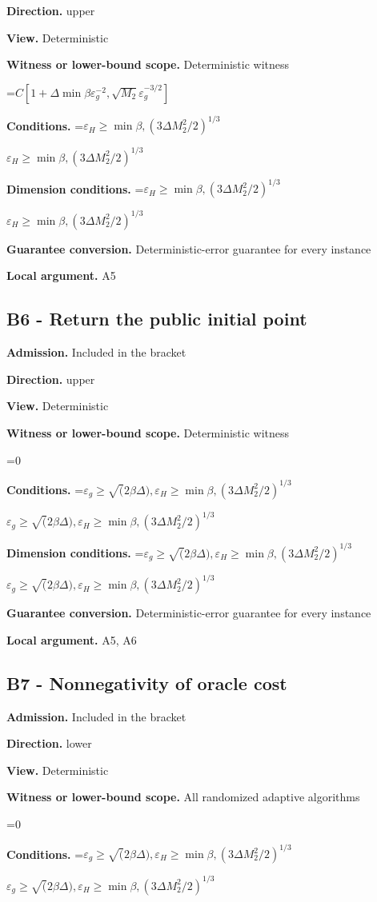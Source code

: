 \documentclass[10pt,a4paper]{article}
\newcommand{\AtlasMath}[1]{\par\begingroup\centering\setbox0=\hbox{$\displaystyle #1$}\ifdim\wd0>1.4\linewidth\typeout{ATLAS WIDE FORMULA: \the\wd0}\fi\ifdim\wd0>\linewidth\resizebox{\linewidth}{!}{\box0}\else\box0\fi\par\endgroup}
\newcommand{\AtlasInlineMath}[1]{\begingroup\setbox0=\hbox{$#1$}\ifdim\wd0>.4\linewidth\endgroup\AtlasMath{#1}\else\endgroup$#1$\fi}
\begin{document}
\textbf{Direction.} upper

\textbf{View.} Deterministic

\textbf{Witness or lower-bound scope.} Deterministic witness

\AtlasMath{C[1+\Delta \min{\beta\varepsilon_g^{-2},\sqrt{M_2}\varepsilon_g^{-3/2}}]}
\textbf{Conditions.} \AtlasInlineMath{\varepsilon_H\ge \min{\beta,(3\Delta M_2^2/2)^{1/3}}}

\textbf{Dimension conditions.} \AtlasInlineMath{\varepsilon_H\ge \min{\beta,(3\Delta M_2^2/2)^{1/3}}}

\textbf{Guarantee conversion.} Deterministic-error guarantee for every instance

\textbf{Local argument.} A5

\subsection{B6 - Return the public initial point}
\textbf{Admission.} Included in the bracket

\textbf{Direction.} upper

\textbf{View.} Deterministic

\textbf{Witness or lower-bound scope.} Deterministic witness

\AtlasMath{0}
\textbf{Conditions.} \AtlasInlineMath{\varepsilon_g\ge \sqrt(2\beta\Delta), \varepsilon_H\ge \min{\beta,(3\Delta M_2^2/2)^{1/3}}}

\textbf{Dimension conditions.} \AtlasInlineMath{\varepsilon_g\ge \sqrt(2\beta\Delta), \varepsilon_H\ge \min{\beta,(3\Delta M_2^2/2)^{1/3}}}

\textbf{Guarantee conversion.} Deterministic-error guarantee for every instance

\textbf{Local argument.} A5, A6

\subsection{B7 - Nonnegativity of oracle cost}
\textbf{Admission.} Included in the bracket

\textbf{Direction.} lower

\textbf{View.} Deterministic

\textbf{Witness or lower-bound scope.} All randomized adaptive algorithms

\AtlasMath{0}
\textbf{Conditions.} \AtlasInlineMath{\varepsilon_g\ge \sqrt(2\beta\Delta), \varepsilon_H\ge \min{\beta,(3\Delta M_2^2/2)^{1/3}}}
\end{document}
